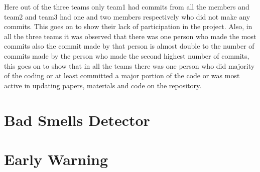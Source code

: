 \documentclass[conference]{IEEEtran}
\begin{document}
Here out of the three teams only team1 had commits from all the members and team2 and team3 had one and two members respectively who did not make any commits. This goes on to show their lack of participation in the project. Also, in all the three teams it was observed that there was one person who made the most commits also the commit made by that person is almost double to the number of commits made by the person who made the second highest number of commits, this goes on to show that in all the teams there was one person who did majority of the coding or at least committed a major portion of the code or was most active in updating papers, materials and code on the repository.

\section{Bad Smells Detector}

\section{Early Warning}
\end{document}
